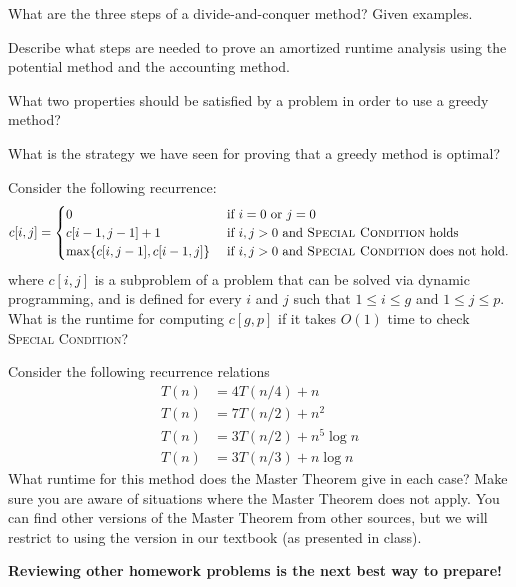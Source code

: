 \documentclass[11  pt]{exam}
\begin{document}
	\begin{questions}
		
		\question What are the three steps of a divide-and-conquer method? Given examples.
		
		\question Describe what steps are needed to prove an amortized runtime analysis using the potential method and the accounting method.
		
		\question What two properties should be satisfied by a problem in order to use a greedy method?
		
		\question What is the strategy we have seen for proving that a greedy method is optimal?
		
		\question Consider the following recurrence:
		\begin{equation*}
			c[i,j] =\begin{cases}
				0 & \text{ if $i = 0$ or $j = 0$} \\
				c[i-1, j-1] + 1 & \text{ if $i,j > 0$ and \textsc{Special Condition} holds}\\
				\max \{ c[i,j-1], c[i-1,j]\} & \text{ if $i,j > 0$ and \textsc{Special Condition} does not hold}.
			\end{cases}
		\end{equation*}
		where $c[i,j]$ is a subproblem of a problem that can be solved via dynamic programming, and is defined for every $i$ and $j$ such that $1 \leq i \leq g$ and $1 \leq j \leq p$. What is the runtime for computing $c[g,p]$ if it takes $O(1)$ time to check \textsc{Special Condition}?
		
		\question Consider the following recurrence relations
		\begin{align*}
			T(n) &= 4T(n/4) + n \\
			T(n) &= 7T(n/2) + n^2 \\
			T(n) &= 3T(n/2) + n^5 \log n\\
			T (n) &= 3T (n/3) + n \log n 
		\end{align*}
		What runtime for this method does the Master Theorem give in each case? Make sure you are aware of situations where the Master Theorem does not apply. You can find other versions of the Master Theorem from other sources, but we will restrict to using the version in our textbook (as presented in class).
		
		\textbf{Reviewing other homework problems is the next best way to prepare!}
		
	\end{questions}
\end{document}
